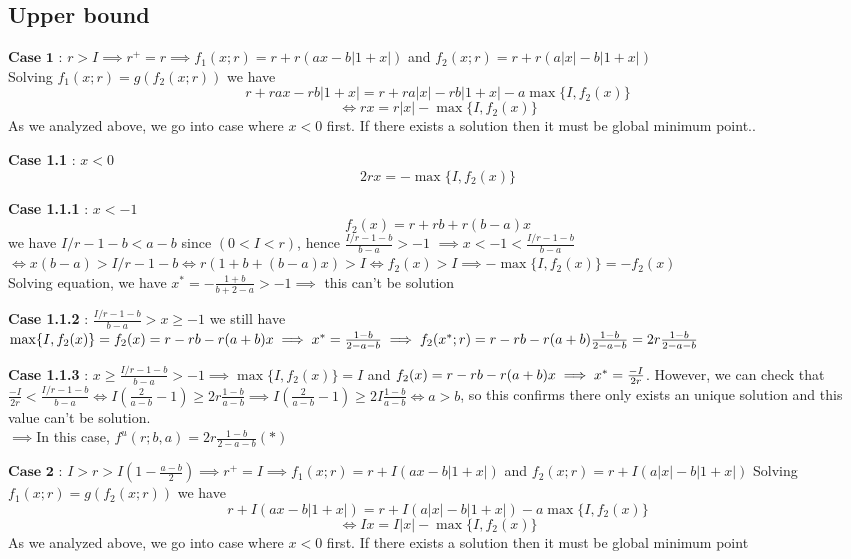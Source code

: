 \documentclass[notitlepage,reqno,11pt]{amsart}
\numberwithin{equation}{section}
\begin{document}
\subsection{ Upper bound}

$\textbf{Case 1}$ : $r>I \implies r^+ = r \implies f_1(x;r) = r +r(ax-b|1+x|)$ and $f_2(x;r) = r+ r(a|x| - b|1+x|) $\\ 
Solving $f_1(x;r) = g(f_2(x;r)) $ we have 
\[ r+ rax - rb|1+x| = r+ ra|x| - rb|1+x| - a \max\{I,f_2(x)\} \] 
\[\iff  rx = r|x| -  \max \{ I, f_2(x) \} \]
As we analyzed above, we go into case where $x < 0 $ first. If there exists a solution then it must be global minimum point.. 


\textbf{Case 1.1 }: $x<0$
\[2rx = - \max\{I,f_2(x) \}  \]

\textbf{ Case 1.1.1} : $x<-1$
\[ f_2(x) = r + rb + r(b-a)x \]
we have  $I/r -1 -b <a-b $ since $(0<I<r)$, hence $\frac{I/r -1 -b}{b-a}> -1 $ $\implies x<-1<\frac{I/r -1 -b}{b-a}  $\\ 
$\iff x(b-a)> I/r -1-b \iff r(1+b+(b-a)x) >I  \iff f_2(x)>I  $$\implies -\max\{I,f_2(x) \} = -f_2(x)$\\
Solving equation, we have $x^* = - \frac{1+b}{b+2-a} > -1 \implies$ this can't be solution 

\textbf{Case 1.1.2} : $\frac{I/r-1-b}{b-a} >x\ge -1$
we still have $\max\{ I,f_2(x) \} = f_2(x)= r-rb -r(a+b)x  \\ \implies x^* = \frac{1-b}{2-a-b} \implies f_2(x^*;r) = r - rb -r(a+b) \frac{1-b}{2-a-b} = 2r \frac{1-b}{2-a-b}$

\textbf{Case 1.1.3 } : $x \ge \frac{I/r-1-b}{b-a} > -1  \implies \max\{ I,f_2(x)\} = I  $ and $f_2(x) = r-rb-r(a+b)x\\  \implies x^* = \frac{-I}{2r} $. However, we can check that $\frac{-I}{2r} < \frac{I/r -1-b}{b-a} \iff I( \frac{2}{a-b}-1) \ge 2r \frac{1-b}{a-b} \implies I( \frac{2}{a-b}-1) \ge 2I \frac{1-b}{a-b} \iff a>b$, so this confirms there only exists an unique solution and this value can't be solution. \\ 
 $\implies $In this case, $f^u(r;b,a) = 2r \frac{1-b}{2-a-b}(*)$ 

$\textbf{Case 2}$ : $I>r> I( 1- \frac{a-b}{2}) \implies r^+ = I \implies f_1(x;r) = r +I (ax - b|1+x|) $ and $f_2(x;r) = r+I(a|x| - b|1+x|)$ 
Solving $f_1(x;r) = g(f_2(x;r)) $ we have 
\[ r+ I(ax - b|1+x|)  = r+ I(a|x| - b|1+x|) - a \max \{ I, f_2(x) \}\]
\[\iff  I x =I|x| -\max \{ I, f_2(x) \}  \]
As we analyzed above, we go into case where $x < 0 $ first. If there exists a solution then it must be global minimum point 
\end{document}
